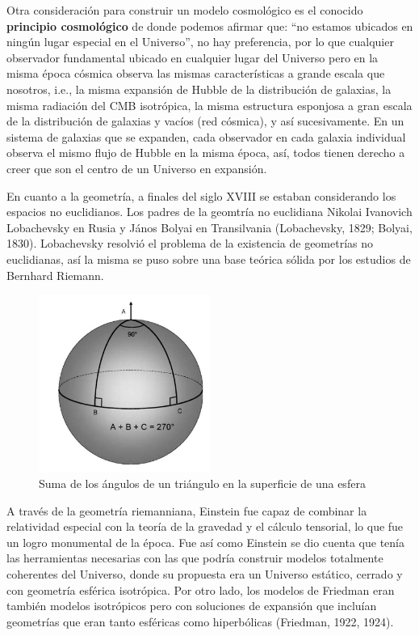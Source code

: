 \documentclass[11pt]{article}
\begin{document}
Otra consideración para construir un modelo cosmológico es el conocido {\bf{principio cosmológico}} de donde podemos afirmar que: ``no estamos ubicados en ningún lugar especial en el Universo'', no hay preferencia, por lo que cualquier observador fundamental ubicado en cualquier lugar del Universo pero en la misma época cósmica observa las mismas características a grande escala que nosotros, i.e., la misma expansión de Hubble de la distribución de galaxias, la misma radiación del CMB isotrópica, la misma estructura esponjosa a gran escala de la distribución de galaxias y vacíos (red cósmica), y así sucesivamente. 
En un sistema de galaxias que se expanden, cada observador en cada galaxia individual observa el mismo flujo de Hubble en la misma época, así, todos tienen derecho a creer que son el centro de un Universo en expansión. 

En cuanto a la geometría, a finales del siglo XVIII se estaban considerando los espacios no euclidianos. Los padres de la geomtría no euclidiana Nikolai Ivanovich Lobachevsky en Rusia y János Bolyai en Transilvania (Lobachevsky, 1829; Bolyai, 1830). Lobachevsky resolvió el problema de la existencia de geometrías no euclidianas, así la misma se puso sobre una base teórica sólida por los estudios de Bernhard Riemann. 

 \begin{figure}          \includegraphics[width=0.5\textwidth]{superficie_esferica_pp152.png}
    \caption{\footnotesize{Suma de los ángulos de un triángulo en la superficie de una esfera}}
    \end{figure}
    
A través de la geometría riemanniana, Einstein fue capaz de combinar la relatividad especial con la teoría de la gravedad y el cálculo tensorial, lo que fue un logro monumental de la época. Fue así como Einstein se dio cuenta que tenía las herramientas necesarias con las que podría construir modelos totalmente coherentes del Universo, donde su propuesta era un Universo estático, cerrado y con geometría esférica isotrópica. Por otro lado, los modelos de Friedman eran también modelos isotrópicos pero con soluciones de expansión que incluían geometrías que eran tanto esféricas como hiperbólicas (Friedman, 1922, 1924). 
\end{document}

